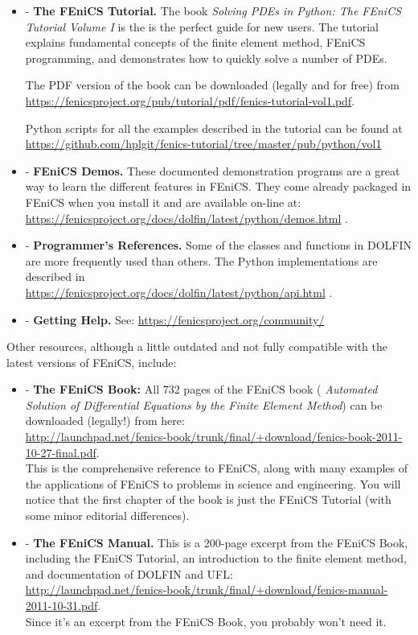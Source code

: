 \documentclass[11pt]{article}
\newcommand{\bit}{\begin{itemize}}
\newcommand{\eit}{\end{itemize}}
\begin{document}
\bit 
 \item[-] {\bf The FEniCS Tutorial.} The book \emph{Solving PDEs in Python: The FEniCS Tutorial Volume I}
 is the is the perfect guide for new users. The tutorial explains fundamental concepts of the finite element method,
 FEniCS programming, and demonstrates how to quickly solve a number of PDEs.
 
 The PDF version of the book can be downloaded (legally and for free) from\\
 \url{https://fenicsproject.org/pub/tutorial/pdf/fenics-tutorial-vol1.pdf}.
 
 Python scripts for all the examples described in the tutorial can be found at\\
 \url{https://github.com/hplgit/fenics-tutorial/tree/master/pub/python/vol1}
 
 \item[-] {\bf FEniCS Demos.} These documented demonstration programs are
   a great way to learn the different features in FEniCS.  They come
   already packaged in FEniCS when you install it and are available on-line at:\\
{\small \url{https://fenicsproject.org/docs/dolfin/latest/python/demos.html} }.

\item[-] {\bf Programmer's References.} Some of the classes and
  functions in DOLFIN are more frequently used than others. The Python
  implementations are described in\\
{\small \url{https://fenicsproject.org/docs/dolfin/latest/python/api.html} }.


\item[-] {\bf Getting Help.} See: \url{https://fenicsproject.org/community/}

\eit
\newpage
Other resources, although a little outdated and not fully compatible
with the latest versions of FEniCS, include:

\bit
\item[-] {\bf The FEniCS Book:} All 732 pages of the FEniCS book ({\em
  Automated Solution of Differential Equations by the Finite Element
  Method}) can be downloaded (legally!) from here:\\
{\footnotesize \url{http://launchpad.net/fenics-book/trunk/final/+download/fenics-book-2011-10-27-final.pdf}}.\\
%
This is the comprehensive reference to FEniCS, along with many
examples of the applications of FEniCS to problems in science and
engineering. You will notice that the first chapter of the book is
just the FEniCS Tutorial (with some minor editorial differences).

\item[-] {\bf The FEniCS Manual.} This is a 200-page excerpt from the
  FEniCS Book, including the FEniCS Tutorial, an introduction to the
  finite element method, and documentation of DOLFIN and UFL:\\
%
{\small \url{http://launchpad.net/fenics-book/trunk/final/+download/fenics-manual-2011-10-31.pdf}}.\\
%
Since it's an excerpt from the FEniCS Book, you probably won't need
it. 


\eit
\end{document}
